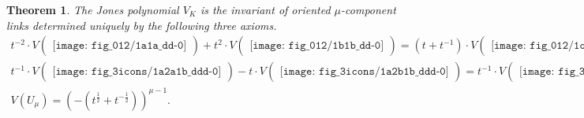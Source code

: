 \documentclass[12pt]{amsart}
\newtheorem{thm}{Theorem}[section]
\theoremstyle{definition}
\theoremstyle{remark}
\begin{document}
\begin{thm}
\label{thm:Jones_knot}
The Jones polynomial $V_K$ is
the invariant of oriented $\mu$-component links
determined uniquely by the following three axioms.
{\allowdisplaybreaks
\begin{gather*}
t^{-2}\cdot V
\begin{pmatrix}
\texttt{[image: fig\_012/1a1a\_dd-0]}
\end{pmatrix}
+t^2\cdot V
\begin{pmatrix}
\texttt{[image: fig\_012/1b1b\_dd-0]}
\end{pmatrix}
=(t+t^{-1})
\cdot V
\begin{pmatrix}
\texttt{[image: fig\_012/1oo\_dd-0]}
\end{pmatrix} ;
\tag*{\rm(II$_V$)}
\\
t^{-1}\cdot V
\begin{pmatrix}
\texttt{[image: fig\_3icons/1a2a1b\_ddd-0]}
\end{pmatrix}
-t\cdot V
\begin{pmatrix}
\texttt{[image: fig\_3icons/1a2b1b\_ddd-0]}
\end{pmatrix}
=
t^{-1}\cdot V
\begin{pmatrix}
\texttt{[image: fig\_3icons/1b2a1a\_ddd-0]}
\end{pmatrix}
-t\cdot V
\begin{pmatrix}
\texttt{[image: fig\_3icons/1b2b1a\_ddd-0]}
\end{pmatrix} ;
\tag*{\rm(III$_V$)}
\\[2ex]
V(U_\mu) = (-(t^{\frac12}+t^{-\frac12}))^{\mu-1} .
\tag*{\rm(U$_V$)}
\end{gather*}
}
\end{thm}
\end{document}
